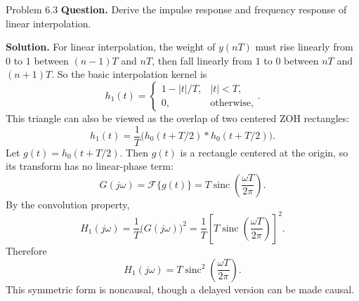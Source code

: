 \documentclass[10pt]{article}
\newcommand{\sinc}{\operatorname{sinc}}
\newcommand{\Prompt}[1]{\textbf{Question.} #1}
\newcommand{\SketchLabel}{\tcblower\textbf{Solution.}}
\begin{document}
\begin{examplebox}{Problem 6.3}
  \Prompt{Derive the impulse response and frequency response of linear interpolation.}

  \medskip
  \SketchLabel{}
  For linear interpolation, the weight of \(y(nT)\) must rise linearly from \(0\) to \(1\)
  between \((n-1)T\) and \(nT\), then fall linearly from \(1\) to \(0\) between \(nT\) and \((n+1)T\).
  So the basic interpolation kernel is
  \[
    h_1(t)=
    \begin{cases}
      1-|t|/T,& |t|<T,\\
      0,& \text{otherwise},
    \end{cases}.
  \]
  This triangle can also be viewed as the overlap of two centered ZOH rectangles:
  \[
    h_1(t)=\frac{1}{T}\bigl(h_0(t+T/2)*h_0(t+T/2)\bigr).
  \]
  Let \(g(t)=h_0(t+T/2)\). Then \(g(t)\) is a rectangle centered at the origin, so its transform has no linear-phase term:
  \[
    G(j\omega)=\mathcal{F}\{g(t)\}=T\sinc\!\left(\frac{\omega T}{2\pi}\right).
  \]
  By the convolution property,
  \[
    H_1(j\omega)
    =\frac{1}{T}\bigl(G(j\omega)\bigr)^2
    =\frac{1}{T}\left[T\sinc\!\left(\frac{\omega T}{2\pi}\right)\right]^2.
  \]
  Therefore
  \[
    H_1(j\omega)=T\sinc^2\!\left(\frac{\omega T}{2\pi}\right).
  \]
  This symmetric form is noncausal, though a delayed version can be made causal.

  \begin{center}
  \end{center}
\end{examplebox}
\end{document}
